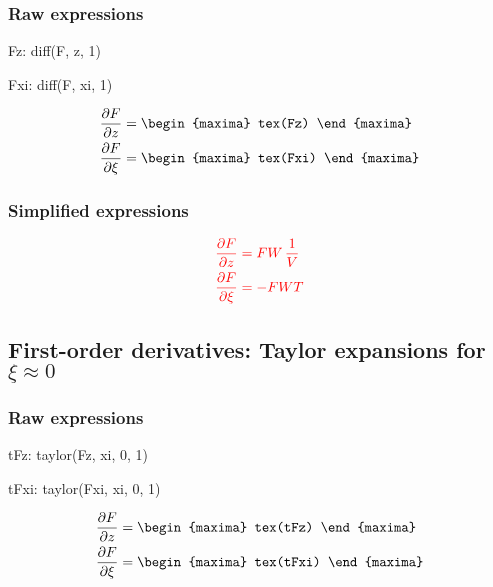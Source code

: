 \subsubsection*{Raw expressions}

\begin{maxima}
  Fz: diff(F, z, 1)
\end{maxima}%
\begin{maxima}
  Fxi: diff(F, xi, 1)
\end{maxima}%

{\color{MonVertF}
\begin{align*}
  \frac{\partial F}{\partial z}
  &=
    \begin{maxima}
       tex(Fz)
    \end{maxima} \\
  \frac{\partial F}{\partial \xi}
  &=
    \begin{maxima}
       tex(Fxi)
    \end{maxima} \\
\end{align*}
}
\subsubsection*{Simplified  expressions}
\begin{equation}
  \label{eq:Der1F}
  \color{red}
  \begin{aligned}
    \frac{\partial F}{\partial z}
    &= F W \, \frac{1}{V} \\
    \frac{\partial F}{\partial \xi}
    &= - F W T
  \end{aligned}
\end{equation}

\subsection{First-order derivatives: Taylor expansions
  for $\xi \approx 0$}

\subsubsection*{Raw  expressions}

\begin{maxima}
  tFz: taylor(Fz, xi, 0, 1)
\end{maxima}%
\begin{maxima}
  tFxi: taylor(Fxi, xi, 0, 1)
\end{maxima}%
{\color{MonVertF}
\begin{align*}
  \frac{\partial F}{\partial z}
  &=
    \begin{maxima}
       tex(tFz)
    \end{maxima} \\
  \frac{\partial F}{\partial \xi}
  &=
    \begin{maxima}
       tex(tFxi)
    \end{maxima} \\
\end{align*}}

